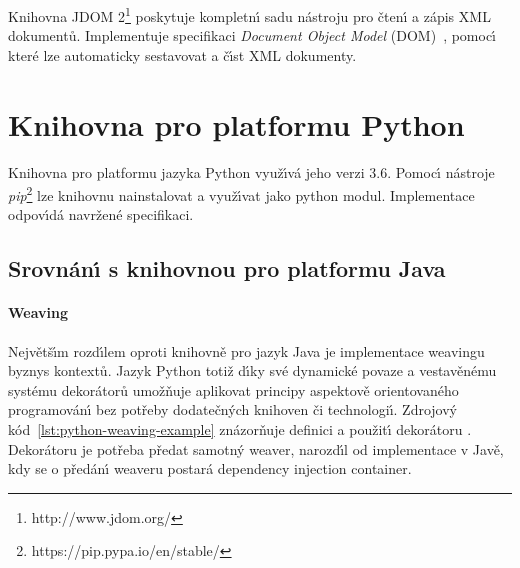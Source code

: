 Knihovna JDOM 2\footnote{http://www.jdom.org/} poskytuje
kompletn\'{\i} sadu nástroju pro čten\'{\i} a zápis \gls{XML} dokumentů.
Implementuje specifikaci \textit{Document Object Model} (\gls{DOM})~\cite{wood2004document},
pomoc\'{\i} které lze automaticky sestavovat a č\'{\i}st \gls{XML} dokumenty.

\section{Knihovna pro platformu Python}

Knihovna pro platformu jazyka Python využ\'{\i}vá jeho
verzi 3.6. Pomoc\'{\i} nástroje \textit{pip}\footnote{https://pip.pypa.io/en/stable/}
lze knihovnu nainstalovat a využ\'{\i}vat jako python modul.
Implementace odpov\'{\i}dá navržené specifikaci.


\subsection{Srovnán\'{\i} s knihovnou pro platformu Java}

\paragraph{Weaving} Největš\'{\i}m rozd\'{\i}lem oproti knihovně pro
jazyk Java je implementace weavingu byznys kontextů.
Jazyk Python totiž d\'{\i}ky své dynamické povaze a vestavěnému
systému dekorátorů umožňuje aplikovat principy aspektově orientovaného
programován\'{\i} bez potřeby dodatečn\'ych knihoven či technologi\'{\i}.
Zdrojov\'y kód~\ref{lst:python-weaving-example} znázorňuje
definici a použit\'{\i} dekorátoru .
Dekorátoru je potřeba předat samotn\'y weaver, narozd\'{\i}l
od implementace v Javě, kdy se o předán\'{\i} weaveru postará dependency
injection container.

